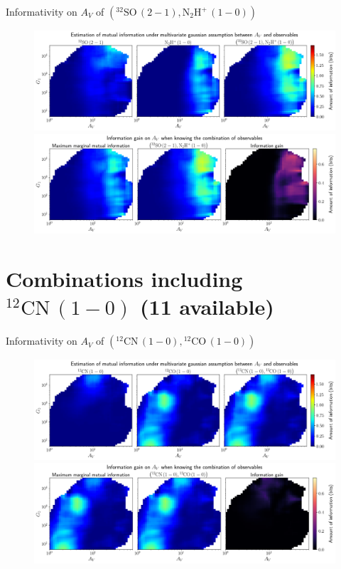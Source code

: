 \documentclass{beamer}
\begin{document}
\begin{frame}{Informativity on $A_V$ of $\left(\mathrm{^{32}SO\,(2-1)},\mathrm{N_2H^+\,(1-0)}\right)$}
    \begin{figure}
        \centering
        \includegraphics[width=0.95\linewidth]{../linearinfo/av__32so21_n2hp10_linearinfo.png}
        \vfill
        \includegraphics[width=0.95\linewidth]{../linearinfo/av__32so21_n2hp10_linearinfo_gain.png}
    \end{figure}
\end{frame}

\section{Combinations including $\mathrm{^{12}CN\,(1-0)}$ (11 available)}

\begin{frame}{Informativity on $A_V$ of $\left(\mathrm{^{12}CN\,(1-0)},\mathrm{^{12}CO\,(1-0)}\right)$}
    \begin{figure}
        \centering
        \includegraphics[width=0.95\linewidth]{../linearinfo/av__12cn10_12co10_linearinfo.png}
        \vfill
        \includegraphics[width=0.95\linewidth]{../linearinfo/av__12cn10_12co10_linearinfo_gain.png}
    \end{figure}
\end{frame}
\end{document}
